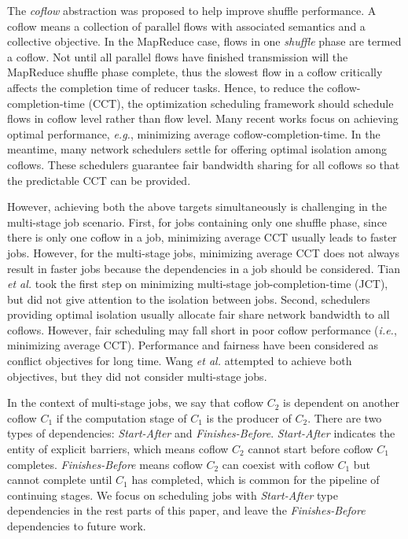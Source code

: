 \documentclass[10pt, conference, letterpaper]{IEEEtran}
\begin{document}
The \emph{coflow} abstraction was proposed to help improve shuffle performance. A coflow means a collection of parallel flows with associated semantics and a collective objective\cite{coflow}. In the MapReduce case, flows in one \emph{shuffle} phase are termed a coflow. %
Not until all parallel flows have finished transmission will the MapReduce shuffle phase complete, thus the slowest flow %
in a coflow critically affects the completion time of reducer tasks. Hence, to reduce the coflow-completion-time (CCT), the optimization scheduling framework should schedule flows in coflow level rather than flow level. Many recent works focus on achieving optimal performance, \emph{e.g.}, minimizing average coflow-completion-time\cite{varys,aalo,coda,barrat,stream}. In the meantime, many network schedulers settle for offering optimal isolation among coflows\cite{HUG,DRF,faircloud,fair}. These schedulers guarantee fair bandwidth sharing for all coflows so that the predictable CCT can be provided.

However, achieving both the above targets simultaneously is challenging in the multi-stage job scenario. First, for jobs containing only one shuffle phase, since there is only one coflow in a job, minimizing average CCT usually leads to faster jobs. However, for the multi-stage jobs, minimizing average CCT does not always result in faster jobs because the dependencies in a job should be considered. Tian \emph{et al.}\cite{bingchuan} took the first step on minimizing multi-stage job-completion-time (JCT), but did not give attention to the isolation between jobs. Second, schedulers providing optimal isolation usually allocate fair share network bandwidth to all coflows. %
However, fair scheduling may fall short in poor coflow performance (\emph{i.e.}, minimizing average CCT)\cite{HUG}. Performance and fairness have been considered as conflict objectives for long time. Wang \emph{et al.}\cite{utopia} attempted to achieve both objectives, but they did not consider multi-stage jobs.

In the context of multi-stage jobs, we say that coflow $C_2$ is dependent on another coflow $C_1$ if the computation stage of $C_1$ is the producer of $C_2$. There are two types of dependencies: \emph{Start-After} and \emph{Finishes-Before}. \emph{Start-After} indicates the entity of explicit barriers\cite{aalo}, which means coflow $C_2$ cannot start before coflow $C_1$ completes. \emph{Finishes-Before} means coflow $C_2$ can coexist with coflow $C_1$ but cannot complete until $C_1$ has completed, which is common for the pipeline of continuing stages\cite{dryad}. We focus on scheduling jobs with \emph{Start-After} type dependencies in the rest parts of this paper, and leave the \emph{Finishes-Before} dependencies to future work.
\end{document}
